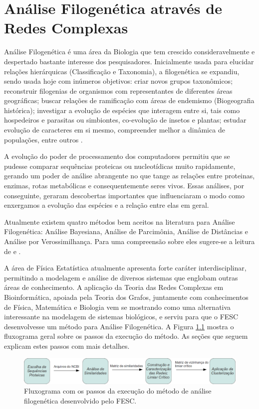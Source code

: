 \chapter{Análise Filogenética através de Redes Complexas} \label{cap:analisefilo}

Análise Filogenética é uma área da Biologia que tem crescido consideravelmente e despertado bastante interesse dos pesquisadores. Inicialmente usada para
elucidar relações hierárquicas (Classificação e Taxonomia), a filogenética se expandiu, sendo usada hoje com inúmeros objetivos: criar novos grupos
taxonômicos; reconstruir filogenias de organismos com representantes de diferentes áreas geográficas; buscar
relações de ramificação com áreas de endemismo (Biogeografia histórica); investigar a evolução de espécies que interagem entre si, tais como hospedeiros
e parasitas ou simbiontes, co-evolução de insetos e plantas; estudar evolução de caracteres em si mesmo, compreender melhor a dinâmica de populações, entre
outros \cite{schneider2007}.

A evolução do poder de processamento dos computadores
permitiu que se pudesse comparar sequências proteicas ou nucleotídicas muito rapidamente, gerando um poder de análise abrangente no que tange as relações entre
proteinas, enzimas, rotas metabólicas e consequentemente seres vivos. Essas análises, por conseguinte, geraram descobertas importantes que influenciaram o
modo como enxergamos a evolução das espécies e a relação entre elas em geral.

Atualmente existem quatro métodos bem aceitos na literatura para Análise Filogenética: Análise Bayesiana, Análise de Parcimônia,
Análise de Distâncias e Análise por Verossimilhança. Para uma compreensão sobre eles sugere-se a leitura de \cite{marcelo2010} e \cite{schneider2007}.

A área de Física Estatística atualmente apresenta forte caráter interdisciplinar, permitindo a modelagem e análise de diversos sistemas
que englobam outras áreas de conhecimento. A aplicação da Teoria das Redes Complexas em Bioinformática, apoiada pela Teoria dos Grafos,
juntamente com conhecimentos de Física, Matemática e Biologia vem se mostrando como uma alternativa interessante na modelagem de sistemas biológicos,
e serviu para que o FESC desenvolvesse um método para Análise Filogenética. A Figura \ref{fig:fluxograma} mostra o fluxograma geral sobre os passos da
execução do método. As seções que seguem explicam estes passos com mais detalhes.

\begin{figure}
\centering
\includegraphics[scale=0.43]{fluxograma}
\caption{Fluxograma com os passos da execução do método de análise filogenética desenvolvido pelo FESC.}
\label{fig:fluxograma}
\end{figure}


